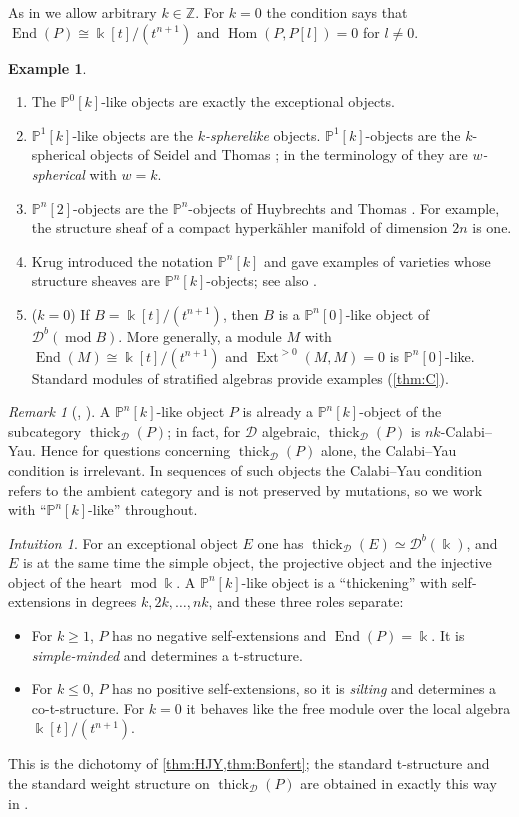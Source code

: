 \documentclass[11pt,reqno]{amsart}
\theoremstyle{plain}
\theoremstyle{definition}
\newtheorem{example}[theorem]{Example}
\theoremstyle{remark}
\newtheorem{remark}[theorem]{Remark}
\newtheorem*{intuition}{Intuition}
\newcommand{\kk}{\Bbbk}
\DeclareMathOperator{\Hom}{Hom}
\DeclareMathOperator{\End}{End}
\DeclareMathOperator{\Ext}{Ext}
\newcommand{\modd}{\operatorname{mod}}
\newcommand{\Db}{\mathcal{D}^b}
\newcommand{\thick}[2][\cD]{\operatorname{thick}_{#1}(#2)}
\newcommand{\Pn}[2]{\mathbb{P}^{#1}[#2]}
\newcommand{\cD}{\mathcal{D}}
\begin{document}
As in \cite{Bonf26} we allow arbitrary $k\in\mathbb{Z}$. For $k=0$ the condition says that $\End(P)\cong\kk[t]/(t^{n+1})$ and $\Hom(P,P[l])=0$ for $l\ne0$.

\begin{example}\label{ex:Pnk}
\leavevmode
\begin{enumerate}
\item The $\Pn0k$-like objects are exactly the exceptional objects.
\item $\Pn1k$-like objects are the \emph{$k$-spherelike} objects. $\Pn1k$-objects are the $k$-spherical objects of Seidel and Thomas \cite{ST01}; in the terminology of \cite{HJY13} they are \emph{$w$-spherical} with $w=k$.
\item $\Pn n2$-objects are the $\mathbb{P}^n$-objects of Huybrechts and Thomas \cite{HT06}. For example, the structure sheaf of a compact hyperk\"ahler manifold of dimension $2n$ is one.
\item Krug \cite{Kru18} introduced the notation $\Pn nk$ and gave examples of varieties whose structure sheaves are $\Pn nk$-objects; see also \cite{HK19}.
\item ($k=0$) If $B=\kk[t]/(t^{n+1})$, then $B$ is a $\Pn n0$-like object of $\Db(\modd B)$. More generally, a module $M$ with $\End(M)\cong\kk[t]/(t^{n+1})$ and $\Ext^{>0}(M,M)=0$ is $\Pn n0$-like. Standard modules of stratified algebras provide examples (\cref{thm:C}).
\end{enumerate}
\end{example}

\begin{remark}[{\cite[Rem.~2.2]{HK19}, \cite[Lemma~2.5]{Bonf26}}]
A $\Pn nk$-like object $P$ is already a $\Pn nk$-object of the subcategory $\thick P$; in fact, for $\cD$ algebraic, $\thick P$ is $nk$-Calabi--Yau. Hence for questions concerning $\thick P$ alone, the Calabi--Yau condition is irrelevant. In sequences of such objects the Calabi--Yau condition refers to the ambient category and is not preserved by mutations, so we work with ``$\Pn nk$-like'' throughout.
\end{remark}

\begin{intuition}
For an exceptional object $E$ one has $\thick E\simeq\Db(\kk)$, and $E$ is at the same time the simple object, the projective object and the injective object of the heart $\modd\kk$. A $\Pn nk$-like object is a ``thickening'' with self-extensions in degrees $k,2k,\dots,nk$, and these three roles separate:
\begin{itemize}
\item For $k\ge1$, $P$ has no negative self-extensions and $\End(P)=\kk$. It is \emph{simple-minded} and determines a t-structure.
\item For $k\le0$, $P$ has no positive self-extensions, so it is \emph{silting} and determines a co-t-structure. For $k=0$ it behaves like the free module over the local algebra $\kk[t]/(t^{n+1})$.
\end{itemize}
This is the dichotomy of \cref{thm:HJY,thm:Bonfert}; the standard t-structure and the standard weight structure on $\thick P$ are obtained in exactly this way in \cite[\S3.2]{Bonf26}.
\end{intuition}
\end{document}

